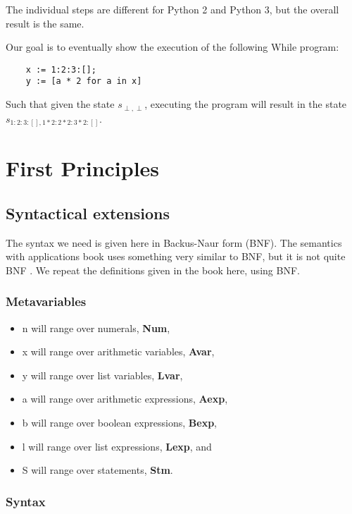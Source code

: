 \documentclass[12pt]{article}
\newcommand{\metavar}[1]{\textlangle#1\textrangle}
\begin{document}
The individual steps are different for Python 2 and Python 3, but the overall result is the same.

Our goal is to eventually show the execution of the following While program:

\begin{lstlisting}
    x := 1:2:3:[];
    y := [a * 2 for a in x]
\end{lstlisting}

Such that given the state $s_{\perp, \perp}$, executing the program will result in the state $s_{1:2:3:[], 1*2:2*2:3*2:[]}$.

\section{First Principles}

\subsection{Syntactical extensions}

The syntax we need is given here in Backus-Naur form (BNF). The semantics with applications book uses something very similar to BNF, but it is not quite BNF \cite[section 1.2]{wiley}. We repeat the definitions given in the book here, using BNF.

\subsubsection{Metavariables}

\begin{itemize}
    \item \metavar{n} will range over numerals, \textbf{Num},
    \item \metavar{x} will range over arithmetic variables, \textbf{Avar},
    \item \metavar{y} will range over list variables, \textbf{Lvar},
    \item \metavar{a} will range over arithmetic expressions, \textbf{Aexp},
    \item \metavar{b} will range over boolean expressions, \textbf{Bexp},
    \item \metavar{l} will range over list expressions, \textbf{Lexp}, and
    \item \metavar{S} will range over statements, \textbf{Stm}.
\end{itemize}

\subsubsection{Syntax}
\end{document}

